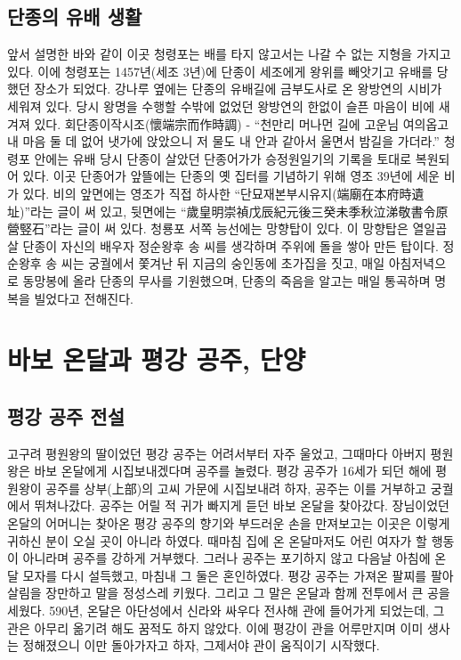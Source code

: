 



\subsection{단종의 유배 생활}
앞서 설명한 바와 같이 이곳 청령포는 배를 타지 않고서는 나갈 수 없는 지형을 가지고 있다. 
이에 청령포는 1457년(세조 3년)에 단종이 세조에게 왕위를 빼앗기고 유배를 당했던 장소가 되었다. 
강나루 옆에는 단종의 유배길에 금부도사로 온 왕방연의 시비가 세워져 있다. 
당시 왕명을 수행할 수밖에 없었던 왕방연의 한없이 슬픈 마음이 비에 새겨져 있다. 
회단종이작시조(懷端宗而作時調) - ``천만리 머나먼 길에 고운님 여의옵고 내 마음 둘 데 없어 냇가에 앉았으니 저 물도 내 안과 같아서 울면서 밤길을 가더라.''
청령포 안에는 유배 당시 단종이 살았던 단종어가가 승정원일기의 기록을 토대로 복원되어 있다. 
이곳 단종어가 앞뜰에는 단종의 옛 집터를 기념하기 위해 영조 39년에 세운 비가 있다. 
비의 앞면에는 영조가 직접 하사한 ``단묘재본부시유지(端廟在本府時遺址)''라는 글이 써 있고, 
뒷면에는 ``歲皇明崇禎戊辰紀元後三癸未季秋泣涕敬書令原營竪石''라는 글이 써 있다. 
청룡포 서쪽 능선에는 망향탑이 있다. 이 망향탑은 열일곱 살 단종이 자신의 배우자 정순왕후 송 씨를 생각하며 주위에 돌을 쌓아 만든 탑이다. 
정순왕후 송 씨는 궁궐에서 쫓겨난 뒤 지금의 숭인동에 초가집을 짓고, 매일 아침저녁으로 동망봉에 올라 단종의 무사를 기원했으며, 
단종의 죽음을 알고는 매일 통곡하며 명복을 빌었다고 전해진다. 
\section{바보 온달과 평강 공주, 단양}
\subsection{평강 공주 전설}
고구려 평원왕의 딸이었던 평강 공주는 어려서부터 자주 울었고, 그때마다 아버지 평원왕은 바보 온달에게 시집보내겠다며 공주를 놀렸다. 
평강 공주가 16세가 되던 해에 평원왕이 공주를 상부(上部)의 고씨 가문에 시집보내려 하자, 
공주는 이를 거부하고 궁궐에서 뛰쳐나갔다. 공주는 어릴 적 귀가 빠지게 듣던 바보 온달을 찾아갔다. 
장님이었던 온달의 어머니는 찾아온 평강 공주의 향기와 부드러운 손을 만져보고는 이곳은 이렇게 귀하신 분이 오실 곳이 아니라 하였다. 
때마침 집에 온 온달마저도 어린 여자가 할 행동이 아니라며 공주를 강하게 거부했다. 
그러나 공주는 포기하지 않고 다음날 아침에 온달 모자를 다시 설득했고, 마침내 그 둘은 혼인하였다. 
평강 공주는 가져온 팔찌를 팔아 살림을 장만하고 말을 정성스레 키웠다. 그리고 그 말은 온달과 함께 전투에서 큰 공을 세웠다. 
590년, 온달은 아단성에서 신라와 싸우다 전사해 관에 들어가게 되었는데, 
그 관은 아무리 옮기려 해도 꿈적도 하지 않았다. 
이에 평강이 관을 어루만지며 이미 생사는 정해졌으니 이만 돌아가자고 하자, 그제서야 관이 움직이기 시작했다. 


